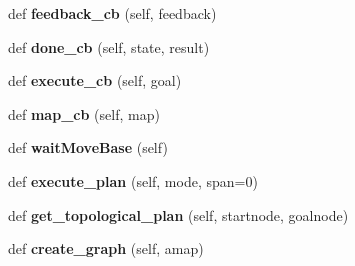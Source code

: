 \begin{DoxyCompactItemize}
def {\bfseries feedback\+\_\+cb} (self, feedback)
\item 
\mbox{\label{classmbf__simple__planner_1_1SimpleTopoPlanner_a015a6a3dca9e1f4fd10944224262aa29}} 
def {\bfseries done\+\_\+cb} (self, state, result)
\item 
\mbox{\label{classmbf__simple__planner_1_1SimpleTopoPlanner_a92599f7ddc7dcc44414522d2d7402ed5}} 
def {\bfseries execute\+\_\+cb} (self, goal)
\item 
\mbox{\label{classmbf__simple__planner_1_1SimpleTopoPlanner_a0770a8618af4a15d7f3cea2ea17dd226}} 
def {\bfseries map\+\_\+cb} (self, map)
\item 
\mbox{\label{classmbf__simple__planner_1_1SimpleTopoPlanner_a1ad8ebe82ebc4e71416c3b9c2c81bc11}} 
def {\bfseries wait\+Move\+Base} (self)
\item 
\mbox{\label{classmbf__simple__planner_1_1SimpleTopoPlanner_a0b4e283dea064f9806550b5dfc668f4c}} 
def {\bfseries execute\+\_\+plan} (self, mode, span=0)
\item 
\mbox{\label{classmbf__simple__planner_1_1SimpleTopoPlanner_aef0599ecb56ba8074f7bf0e91ff27774}} 
def {\bfseries get\+\_\+topological\+\_\+plan} (self, startnode, goalnode)
\item 
\mbox{\label{classmbf__simple__planner_1_1SimpleTopoPlanner_a4e68b7ed683259dbc0d71e4ec0785b37}} 
def {\bfseries create\+\_\+graph} (self, amap)
\end{DoxyCompactItemize}
